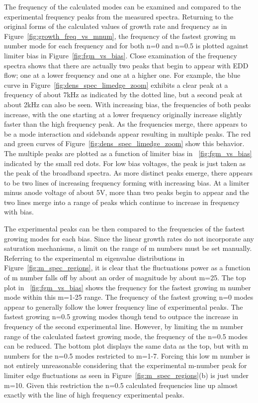 \documentclass[aip,pop,amsmath,amssymb,reprint,superscriptaddress]{revtex4-1} %
\begin{document}
The frequency of the calculated modes can be examined and compared to the experimental frequency peaks from the measured spectra. Returning to the original forms of the calculated values of growth rate and frequency as in Figure~\ref{fig:growth_freq_vs_mnum}, the frequency of the fastest growing m number mode for each frequency and for both n=0 and n=0.5 is plotted against limiter bias in Figure~\ref{fig:fgm_vs_bias}. Close examination of the frequency spectra shows that there are actually two peaks that begin to appear with EDD flow; one at a lower frequency and one at a higher one. For example, the blue curve in Figure~\ref{fig:dens_spec_limedge_zoom} exhibits a clear peak at a frequency of about 7kHz as indicated by the dotted line, but a second peak at about 2kHz can also be seen. With increasing bias, the frequencies of both peaks increase, with the one starting at a lower frequency originally increase slightly faster than the high frequency peak. As the frequencies merge, there appears to be a mode interaction and sidebands appear resulting in multiple peaks. The red and green curves of Figure~\ref{fig:dens_spec_limedge_zoom} show this behavior. The multiple peaks are plotted as a function of limiter bias in ~\ref{fig:fgm_vs_bias} indicated by the small red dots. For low bias voltages, the peak is just taken as the peak of the broadband spectra. As more distinct peaks emerge, there appears to be two lines of increasing frequency forming with increasing bias. At a limiter minus anode voltage of about 5V, more than two peaks begin to appear and the two lines merge into a range of peaks which continue to increase in frequency with bias.

The experimental peaks can be then compared to the frequencies of the fastest growing modes for each bias. Since the linear growth rates do not incorporate any saturation mechanisms, a limit on the range of m numbers must be set manually. Referring to the experimental m eigenvalue distributions in Figure~\ref{fig:m_spec_regions}, it is clear that the fluctuations power as a function of m number falls off by about an order of magnitude by about m=25. The top plot in ~\ref{fig:fgm_vs_bias} shows the frequency for the fastest growing m number mode within this m=1-25 range. The frequency of the fastest growing n=0 modes appear to generally follow the lower frequency line of experimental peaks. The fastest growing n=0.5 growing modes though tend to outpace the increase in frequency of the second experimental line. However, by limiting the m number range of the calculated fastest growing mode, the frequency of the n=0.5 modes can be reduced. The bottom plot displays the same data as the top, but with m numbers for the n=0.5 modes restricted to m=1-7. Forcing this low m number is not entirely unreasonable considering that the experimental m-number peak for limiter edge fluctuations as seen in Figure~\ref{fig:m_spec_regions}(b) is just under m=10. Given this restriction the n=0.5 calculated frequencies line up almost exactly with the line of high frequency experimental peaks.
\end{document}
